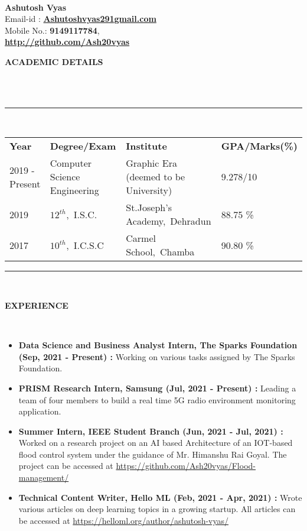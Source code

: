 \documentclass[a4paper,10pt]{article}
\newcommand{\lsep}{-0.5cm}
\newcommand{\resheading}[1]{{\small \colorbox{mygrey}{\begin{minipage}{0.975\textwidth}{\textbf{#1 \vphantom{p\^{E}}}}\end{minipage}}}}
\begin{document}
\hspace{0.5cm}\\[-0.2cm]

\textbf{Ashutosh Vyas} \\
\indent Email-id : \textbf{\url{Ashutoshvyas291gmail.com}} \\
\indent Mobile No.: \textbf{9149117784}, \ \\
\indent \textbf{\url{http://github.com/Ash20vyas}}\\

\resheading{\textbf{ACADEMIC DETAILS} }\\[\lsep]
\\
\indent \rule{6.8in}{0.4pt}\\
\indent \begin{tabular}{ l @{\hskip 0.15in} l @{\hskip 0.15in} l @{\hskip 0.15in} l @{\hskip 0.15in} }
\noindent \textbf{Year} & \textbf{Degree/Exam} & \textbf{Institute} & \textbf{GPA/Marks(\%)}\\
2019 - Present & Computer Science Engineering & Graphic Era (deemed to be University) & 9.278/10 \\
2019 & $12^{th}$,\ I.S.C. & St.Joseph's Academy,\ Dehradun & 88.75 \% \\
2017 & $10^{th}$,\ I.C.S.C & Carmel School,\ Chamba & 90.80 \%\\

\end{tabular}
\indent \rule{6.8in}{0.4pt}
\\

\resheading{\textbf{EXPERIENCE} }\\[\lsep]
\begin{itemize}
\setlength\itemsep{0.5em}
\item \textbf{Data Science and Business Analyst Intern, The Sparks Foundation (Sep, 2021 - Present) : } Working on various tasks assigned by The Sparks Foundation.
\item \textbf{PRISM Research Intern, Samsung (Jul, 2021 - Present) : } Leading a team of four members to build a real time 5G radio environment monitoring application.
\item \textbf{Summer Intern, IEEE Student Branch (Jun, 2021 - Jul, 2021) : }
Worked on a research project on an AI based Architecture of an IOT-based flood control system under the guidance of Mr. Himanshu Rai Goyal.
The project can be accessed at \url{https://github.com/Ash20vyas/Flood-management/}
\item \textbf{Technical Content Writer, Hello ML (Feb, 2021 - Apr, 2021) : }Wrote various articles on deep learning topics in a growing startup.
All articles can be accessed at \url{https://helloml.org/author/ashutosh-vyas/}
\end{itemize}
\end{document}
